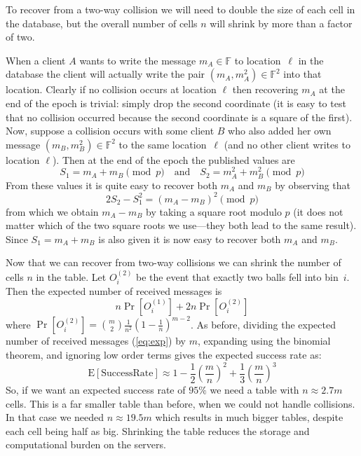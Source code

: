 \documentclass[10pt,twocolumn]{article}
\newcommand{\E}{\textrm{E}}
\newcommand{\F}{\mathbb{F}}
\begin{document}
To recover from a two-way collision we will need to double the size of
each cell in the database, but the overall number of cells $n$ will
shrink by more than a factor of two.

When a client $A$ wants to write the message
$m_A \in \F$ to location~$\ell$ in the database the client will
actually write the pair $(m_A,m_A^2) \in \F^2$ into that location.  
Clearly if no
collision occurs at location $\ell$ then recovering $m_A$ at the end
of the epoch is trivial: simply drop the second coordinate (it is easy
to test that no collision occurred because the second coordinate is a
square of the first).  Now, suppose a collision occurs with some
client $B$ who also added her own message $(m_B,m_B^2) \in \F^2$ to
the same location~$\ell$ (and no other client writes to location
$\ell$).  Then at the end of the epoch the published values are
\[    S_1 = m_A + m_B  \pmod p \quad\text{and}\quad S_2 = m_A^2 + m_B^2  \pmod p\]
From these values it is quite easy to recover both $m_A$ and $m_B$
by observing that
\[  2 S_2 - S_1^2 = (m_A - m_B)^2  \pmod p\]
from which we obtain $m_A - m_B$ by taking a square root modulo $p$ (it does not
matter which of the two square roots we use---they both lead to the
same result).  Since $S_1 = m_A+m_B$ is also given it is now easy to
recover both $m_A$ and $m_B$.

Now that we can recover from two-way collisions we can shrink the
number of cells $n$ in the table.  Let $O_i^{(2)}$ be the event that 
exactly two balls fell into bin~$i$.  Then the expected number
of received messages is
\begin{equation} \label{eq:exp}
  n \Pr[O_{i}^{(1)}] + 2n \Pr[O_{i}^{(2)}]  
\end{equation}
where $\Pr[O_{i}^{(2)}] = {m \choose 2} \frac{1}{n^2} \left(1-\frac{1}{n}\right)^{m-2}$.
As before, dividing the expected number of received messages (\ref{eq:exp}) 
by $m$, expanding using the binomial theorem, and ignoring low order terms
gives the expected success rate as:
\[    \E[\text{SuccessRate}] 
                \approx 
      1 - \frac{1}{2} \left(\frac{m}{n}\right)^2 + 
           \frac{1}{3} \left(\frac{m}{n}\right)^3  \]
So, if we want an expected success rate of $95\%$ 
we need a table with $n \approx 2.7 m$ cells.  
This is a far smaller table than before, when we could not handle 
collisions.  In that case we needed $n \approx 19.5 m$ which results
in much bigger tables, despite each cell being half as big.
Shrinking the table reduces the storage
and computational burden on the servers.
\end{document}
